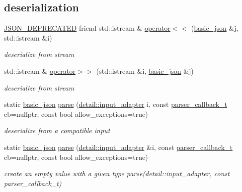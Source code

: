 \subsection*{deserialization}
\begin{DoxyCompactItemize}
\item 
\hyperlink{json_8hpp_a584fd8f49cd7f4ecf5baba15b5b53cdd}{J\+S\+O\+N\+\_\+\+D\+E\+P\+R\+E\+C\+A\+T\+ED} friend std\+::istream \& \hyperlink{classnlohmann_1_1basic__json_ab7285a92514fcdbe6de505ebaba92ea3}{operator$<$$<$} (\hyperlink{classnlohmann_1_1basic__json}{basic\+\_\+json} \&j, std\+::istream \&i)
\begin{DoxyCompactList}\small\item\em deserialize from stream \end{DoxyCompactList}\item 
std\+::istream \& \hyperlink{classnlohmann_1_1basic__json_aaf363408931d76472ded14017e59c9e8}{operator$>$$>$} (std\+::istream \&i, \hyperlink{classnlohmann_1_1basic__json}{basic\+\_\+json} \&j)
\begin{DoxyCompactList}\small\item\em deserialize from stream \end{DoxyCompactList}\item 
static \hyperlink{classnlohmann_1_1basic__json}{basic\+\_\+json} \hyperlink{classnlohmann_1_1basic__json_aa9676414f2e36383c4b181fe856aa3c0}{parse} (\hyperlink{classnlohmann_1_1detail_1_1input__adapter}{detail\+::input\+\_\+adapter} i, const \hyperlink{classnlohmann_1_1basic__json_ab4f78c5f9fd25172eeec84482e03f5b7}{parser\+\_\+callback\+\_\+t} cb=nullptr, const bool allow\+\_\+exceptions=true)
\begin{DoxyCompactList}\small\item\em deserialize from a compatible input \end{DoxyCompactList}\item 
static \hyperlink{classnlohmann_1_1basic__json}{basic\+\_\+json} \hyperlink{classnlohmann_1_1basic__json_af3501e04d3c7a824bffb05a5a45ba884}{parse} (\hyperlink{classnlohmann_1_1detail_1_1input__adapter}{detail\+::input\+\_\+adapter} \&i, const \hyperlink{classnlohmann_1_1basic__json_ab4f78c5f9fd25172eeec84482e03f5b7}{parser\+\_\+callback\+\_\+t} cb=nullptr, const bool allow\+\_\+exceptions=true)
\begin{DoxyCompactList}\small\item\em create an empty value with a given type parse(detail\+::input\+\_\+adapter, const parser\+\_\+callback\+\_\+t) \end{DoxyCompactList}\item 

\end{DoxyCompactItemize}
